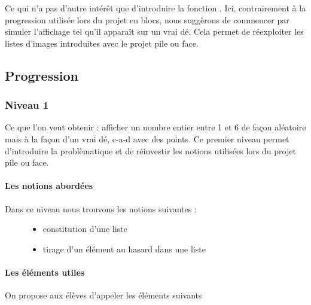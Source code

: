 \documentclass[letterpaper,10pt,french]{sphinxmanual}
\begin{document}
Ce qui n’a pas d’autre intérêt que d’introduire la fonction
.
Ici, contrairement à la progression utilisée lors du projet en blocs, nous suggèrons
de commencer par simuler l’affichage tel qu’il apparaît sur un vrai dé.
Cela  permet de réexploiter les listes d’images introduites avec le projet pile ou face.


\subsection{Progression}
\label{\detokenize{decouverte/de6faces-python:id1}}

\subsubsection{Niveau 1}
\label{\detokenize{decouverte/de6faces-python1:niveau-1}}\label{\detokenize{decouverte/de6faces-python1::doc}}
Ce que l’on veut obtenir : afficher  un nombre entier entre 1 et 6 de façon aléatoire mais
à la façon d’un vrai dé, c-a-d avec des points.
Ce premier niveau permet d’introduire la problèmatique et de réinvestir les notions
utilisées lors du projet pile ou face.


\paragraph{Les notions abordées}
\label{\detokenize{decouverte/de6faces-python1:les-notions-abordees}}\begin{description}
\item[{Dans ce niveau nous trouvons les notions suivantes :}] \leavevmode\begin{itemize}
\item {} 
constitution d’une liste

\item {} 
tirage d’un élément au hasard dans une liste

\end{itemize}

\end{description}


\paragraph{Les éléments utiles}
\label{\detokenize{decouverte/de6faces-python1:les-elements-utiles}}
On propose aux élèves d’appeler les éléments suivants
\end{document}
